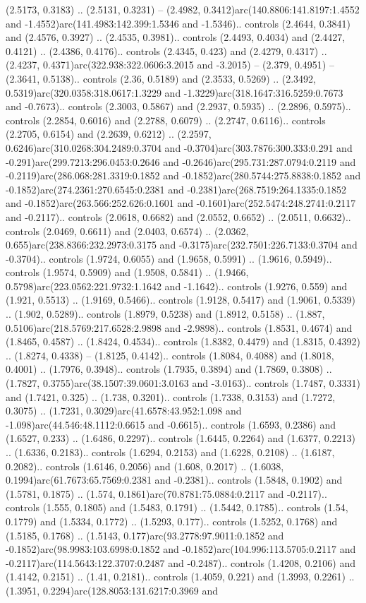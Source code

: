 (2.5173, 0.3183) .. (2.5131, 0.3231) -- (2.4982, 0.3412)arc(140.8806:141.8197:1.4552 and -1.4552)arc(141.4983:142.399:1.5346 and -1.5346).. controls (2.4644, 0.3841) and (2.4576, 0.3927) .. (2.4535, 0.3981).. controls (2.4493, 0.4034) and (2.4427, 0.4121) .. (2.4386, 0.4176).. controls (2.4345, 0.423) and (2.4279, 0.4317) .. (2.4237, 0.4371)arc(322.938:322.0606:3.2015 and -3.2015) -- (2.379, 0.4951) -- (2.3641, 0.5138).. controls (2.36, 0.5189) and (2.3533, 0.5269) .. (2.3492, 0.5319)arc(320.0358:318.0617:1.3229 and -1.3229)arc(318.1647:316.5259:0.7673 and -0.7673).. controls (2.3003, 0.5867) and (2.2937, 0.5935) .. (2.2896, 0.5975).. controls (2.2854, 0.6016) and (2.2788, 0.6079) .. (2.2747, 0.6116).. controls (2.2705, 0.6154) and (2.2639, 0.6212) .. (2.2597, 0.6246)arc(310.0268:304.2489:0.3704 and -0.3704)arc(303.7876:300.333:0.291 and -0.291)arc(299.7213:296.0453:0.2646 and -0.2646)arc(295.731:287.0794:0.2119 and -0.2119)arc(286.068:281.3319:0.1852 and -0.1852)arc(280.5744:275.8838:0.1852 and -0.1852)arc(274.2361:270.6545:0.2381 and -0.2381)arc(268.7519:264.1335:0.1852 and -0.1852)arc(263.566:252.626:0.1601 and -0.1601)arc(252.5474:248.2741:0.2117 and -0.2117).. controls (2.0618, 0.6682) and (2.0552, 0.6652) .. (2.0511, 0.6632).. controls (2.0469, 0.6611) and (2.0403, 0.6574) .. (2.0362, 0.655)arc(238.8366:232.2973:0.3175 and -0.3175)arc(232.7501:226.7133:0.3704 and -0.3704).. controls (1.9724, 0.6055) and (1.9658, 0.5991) .. (1.9616, 0.5949).. controls (1.9574, 0.5909) and (1.9508, 0.5841) .. (1.9466, 0.5798)arc(223.0562:221.9732:1.1642 and -1.1642).. controls (1.9276, 0.559) and (1.921, 0.5513) .. (1.9169, 0.5466).. controls (1.9128, 0.5417) and (1.9061, 0.5339) .. (1.902, 0.5289).. controls (1.8979, 0.5238) and (1.8912, 0.5158) .. (1.887, 0.5106)arc(218.5769:217.6528:2.9898 and -2.9898).. controls (1.8531, 0.4674) and (1.8465, 0.4587) .. (1.8424, 0.4534).. controls (1.8382, 0.4479) and (1.8315, 0.4392) .. (1.8274, 0.4338) -- (1.8125, 0.4142).. controls (1.8084, 0.4088) and (1.8018, 0.4001) .. (1.7976, 0.3948).. controls (1.7935, 0.3894) and (1.7869, 0.3808) .. (1.7827, 0.3755)arc(38.1507:39.0601:3.0163 and -3.0163).. controls (1.7487, 0.3331) and (1.7421, 0.325) .. (1.738, 0.3201).. controls (1.7338, 0.3153) and (1.7272, 0.3075) .. (1.7231, 0.3029)arc(41.6578:43.952:1.098 and -1.098)arc(44.546:48.1112:0.6615 and -0.6615).. controls (1.6593, 0.2386) and (1.6527, 0.233) .. (1.6486, 0.2297).. controls (1.6445, 0.2264) and (1.6377, 0.2213) .. (1.6336, 0.2183).. controls (1.6294, 0.2153) and (1.6228, 0.2108) .. (1.6187, 0.2082).. controls (1.6146, 0.2056) and (1.608, 0.2017) .. (1.6038, 0.1994)arc(61.7673:65.7569:0.2381 and -0.2381).. controls (1.5848, 0.1902) and (1.5781, 0.1875) .. (1.574, 0.1861)arc(70.8781:75.0884:0.2117 and -0.2117).. controls (1.555, 0.1805) and (1.5483, 0.1791) .. (1.5442, 0.1785).. controls (1.54, 0.1779) and (1.5334, 0.1772) .. (1.5293, 0.177).. controls (1.5252, 0.1768) and (1.5185, 0.1768) .. (1.5143, 0.177)arc(93.2778:97.9011:0.1852 and -0.1852)arc(98.9983:103.6998:0.1852 and -0.1852)arc(104.996:113.5705:0.2117 and -0.2117)arc(114.5643:122.3707:0.2487 and -0.2487).. controls (1.4208, 0.2106) and (1.4142, 0.2151) .. (1.41, 0.2181).. controls (1.4059, 0.221) and (1.3993, 0.2261) .. (1.3951, 0.2294)arc(128.8053:131.6217:0.3969 and 
